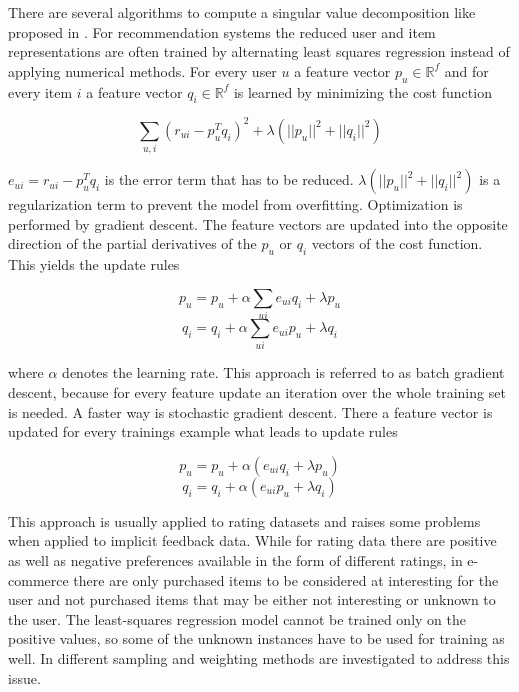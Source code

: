 \documentclass[10pt]{reportMaster}
\begin{document}
There are several algorithms to compute a singular value decomposition like proposed in \cite{svdGolubSolution}.
For recommendation systems the reduced user and item representations are often trained by alternating least squares regression instead of applying numerical methods. %
For every user $u$ a feature vector $p_u \in \mathds{R}^f$ and for every item $i$ a feature vector $q_i \in \mathds{R}^f$ is learned by minimizing the cost function 

\begin{equation}
	\sum_{u, i}{(r_{ui} - p_u^T q_i)^2 + \lambda (||p_u||^2 + ||q_i||^2)}
\end{equation}

$e_{ui} = r_{ui} - p_u^T q_i$ is the error term that has to be reduced.
$\lambda (||p_u||^2 + ||q_i||^2)$ is a regularization term to prevent the model from overfitting.
Optimization is performed by gradient descent.
The feature vectors are updated into the opposite direction of the partial derivatives of the $p_u$ or $q_i$ vectors of the cost function.
This yields the update rules

\begin{equation}
	p_u = p_u + \alpha \sum_{ui}{e_{ui} q_i + \lambda p_u}
\end{equation}
\begin{equation}
	q_i = q_i + \alpha \sum_{ui}{e_{ui} p_u + \lambda q_i}
\end{equation}

where $\alpha$ denotes the learning rate.
This approach is referred to as batch gradient descent, because for every feature update an iteration over the whole training set is needed.
A faster way is stochastic gradient descent. %
There a feature vector is updated for every trainings example what leads to update rules 

\begin{equation}
	p_u = p_u + \alpha (e_{ui} q_i + \lambda p_u)
\end{equation}
\begin{equation}
	q_i = q_i + \alpha (e_{ui} p_u + \lambda q_i)
\end{equation}

This approach is usually applied to rating datasets and raises some problems when applied to implicit feedback data.
While for rating data there are positive as well as negative preferences available in the form of different ratings, in e-commerce there are only purchased items to be considered at interesting for the user and not purchased items that may be either not interesting or unknown to the user.
The least-squares regression model cannot be trained only on the positive values, so some of the unknown instances have to be used for training as well.
In \cite{occf} different sampling and weighting methods are investigated to address this issue. %
\end{document}
